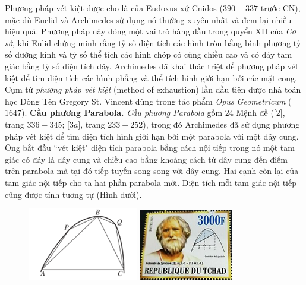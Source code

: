 \begin{multicols}{2}
\begin{figure}[H]
		\vspace*{-10pt}
	\end{figure}
	Phương pháp vét kiệt được cho là của Eudoxus xứ Cnidos ($390-337$ trước CN), mặc dù Euclid và Archimedes sử dụng nó thường xuyên nhất và đem lại nhiều hiệu quả. Phương pháp này đóng một vai trò hàng đầu trong quyển XII của \textit{Cơ sở}, khi Eulid chứng minh rằng tỷ số diện tích các hình tròn bằng bình phương tỷ số đường kính và tỷ số thể tích các hình chóp có cùng chiều cao và có đáy tam giác bằng tỷ số diện tích đáy. Archimedes đã khai thác triệt để phương pháp vét kiệt để tìm diện tích các hình phẳng và thể tích hình giới hạn bởi các mặt cong. Cụm từ \textit{phương pháp vét kiệt} (method of exhaustion) lần đầu tiên được nhà toán học Dòng Tên Gregory St. Vincent dùng trong tác phẩm \textit{Opus Geometricum} ($1647$).
	\vskip 0.1cm 
	\textbf{\color{lichsutoanhoc}Cầu phương Parabola.} \textit{Cầu phương Parabola} gồm $24$ Mệnh đề ([$2$], trang $336-345$; [$3a$], trang $233-252$), trong đó Archimedes đã sử dụng phương pháp vét kiệt để tìm diện tích hình giới hạn bởi một parabola với một dây cung. Ông bắt đầu ``vét kiệt" diện tích parabola bằng cách nội tiếp trong nó một tam giác có đáy là dây cung và chiều cao bằng khoảng cách từ dây cung đến điểm trên parabola mà tại đó tiếp tuyến song song với dây cung. Hai cạnh còn lại của tam giác nội tiếp cho ta hai phần parabola mới. Diện tích mỗi tam giác nội tiếp cũng được tính tương tự (Hình dưới).
	\begin{figure}[H]
		\vspace*{-5pt}
		\centering
		\captionsetup{labelformat= empty, justification=centering}
		\includegraphics[height=0.35\linewidth]{9}
		\includegraphics[height=0.35\linewidth]{9b}

\end{figure}
\end{multicols}
